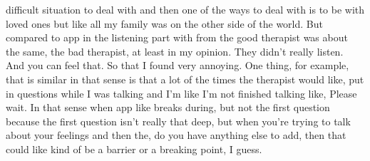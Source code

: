 difficult situation to deal with and then one of the ways to deal with is to be with loved ones but like all my family was on the other side of the world. But compared to \acl{app} in the listening part with from the good therapist was about the same, the bad therapist, at least in my opinion. They didn't really listen. And you can feel that. So that I found very annoying. One thing, for example, that is similar in that sense is that a lot of the times the therapist would like, put in questions while I was talking and I'm like I'm not finished talking like, Please wait. In that sense when \acl{app} like breaks during, but not the first question because the first question isn't really that deep, but when you're trying to talk about your feelings and then the, do you have anything else to add, then that could like kind of be a barrier or a breaking point, I guess.



